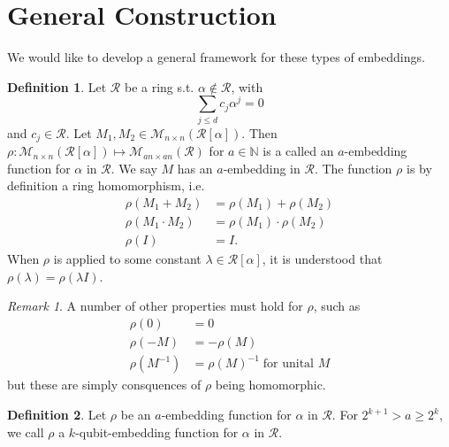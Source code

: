 \documentclass{article}
\theoremstyle{definition}
\newtheorem{definition}{Definition}
\theoremstyle{theorem}
\theoremstyle{remark}
\newtheorem{remark}{Remark}
\begin{document}
	\section{General Construction}
	We would like to develop a general framework for these types of embeddings.
	\begin{definition}
		Let $\mathcal{R}$ be a ring s.t. $\alpha\not\in \mathcal{R}$, with
		\[
			\sum_{j\leq d} c_j \alpha^j = 0
		\]
		and $c_j\in \mathcal{R}$. Let $M_1,M_2\in\mathcal{M}_{n\times n}(\mathcal{R}[\alpha])$. Then $\rho:\mathcal{M}_{n\times n}(\mathcal{R}[\alpha])\mapsto \mathcal{M}_{a n\times a n}(\mathcal{R})$ for $a \in \mathbb{N}$ is a called an $a$-embedding function for $\alpha$ in $\mathcal{R}$. We say $M$ has an $a$-embedding in $\mathcal{R}$. The function $\rho$ is by definition a ring homomorphism, i.e.
		\begin{align*}
			\rho(M_1 + M_2) &= \rho(M_1) + \rho(M_2)\\
			\rho(M_1\cdot M_2) &= \rho(M_1)\cdot \rho(M_2)\\
			\rho(I) &= I.
		\end{align*}
		When $\rho$ is applied to some constant $\lambda\in\mathcal{R}[\alpha]$, it is understood that $\rho(\lambda) = \rho(\lambda I)$.
		\end{definition}
	\begin{remark}
		A number of other properties must hold for $\rho$, such as
		\begin{align*}
			\rho(0) &= 0\\
			\rho(-M) &= -\rho(M)\\
			\rho(M^{-1}) &= \rho(M)^{-1}\;\mbox{for unital }M
		\end{align*}
		but these are simply consquences of $\rho$ being homomorphic.
	\end{remark}
	\begin{definition}
		Let $\rho$ be an $a$-embedding function for $\alpha$ in $\mathcal{R}$. For $2^{k+1}>a\geq 2^{k}$, we call $\rho$ a $k$-qubit-embedding function for $\alpha$ in $\mathcal{R}$.
	\end{definition}
\end{document}
